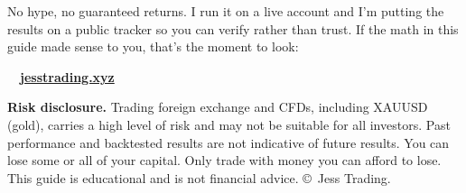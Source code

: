 \documentclass[11pt]{article}
\begin{document}
\vspace{0.8ex}
No hype, no guaranteed returns. I run it on a live account and I'm putting the results on a public tracker so you can verify rather than trust. If the math in this guide made sense to you, that's the moment to look:

\vspace{1ex}
\begin{center}
{\large\faArrowRight\ \ \href{https://jesstrading.xyz}{\textbf{\color{neon}jesstrading.xyz}}}
\end{center}

\vfill

\begin{leakbox}
{\color{inkmuted}\footnotesize \textbf{Risk disclosure.} Trading foreign exchange and CFDs, including XAUUSD (gold), carries a high level of risk and may not be suitable for all investors. Past performance and backtested results are not indicative of future results. You can lose some or all of your capital. Only trade with money you can afford to lose. This guide is educational and is not financial advice. \copyright\ Jess Trading.}
\end{leakbox}
\end{document}
